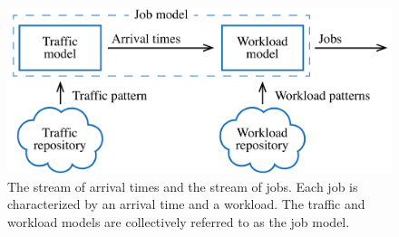 \begin{figure}
  \centering
  \includegraphics[width=1.0\columnwidth]{include/assets/figures/streams.pdf}
  \caption{The stream of arrival times and the stream of jobs. Each job is
  characterized by an arrival time and a workload. The traffic and workload
  models are collectively referred to as the job model.}
\end{figure}
